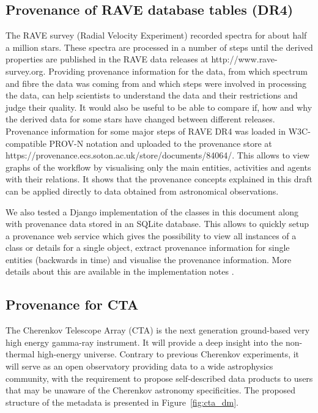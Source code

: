 \subsection{Provenance of RAVE database tables (DR4)}
The RAVE survey (Radial Velocity Experiment) recorded spectra for about half a 
million stars. These spectra are processed in a number of steps until the 
derived properties are published in the RAVE data releases at http://www.rave-survey.org.
Providing provenance information for the data, from which spectrum and fibre the
data was coming from and which steps were involved in processing the data, can help scientists
to understand the data and their restrictions and judge their quality.
It would also be useful to be able to compare if, how and why the derived data 
for some stars have changed between different releases.
Provenance information for some major steps of RAVE DR4 was loaded in 
W3C-compatible PROV-N notation and uploaded to the provenance store at 
https://provenance.ecs.soton.ac.uk/store/documents/84064/. This allows to view 
graphs of the workflow by visualising only the main entities, activities and agents 
with their relations. It shows that the provenance concepts explained in this draft 
can be applied directly to data obtained from astronomical observations.

We also tested a Django implementation of the classes in this document along with provenance data stored in an SQLite database. This allows to quickly setup a provenance web service
which gives the possibility to view all instances of a class or details for a single object, 
extract provenance information for single entities (backwards in time) and 
visualise the provenance information. 
More details about this are available in the implementation notes \citep{std:ProvenanceImplementationNote}.




\subsection{Provenance for CTA}

The Cherenkov Telescope Array (CTA) is the next generation ground-based very high energy gamma-ray instrument. It will provide a deep insight into the non-thermal high-energy universe. Contrary to previous Cherenkov experiments, it will serve as an open observatory providing data to a wide astrophysics community, with the requirement to propose self-described data products to users that may be unaware of the Cherenkov astronomy specificities. The proposed structure of the metadata is presented in Figure~\ref{fig:cta_dm}.


